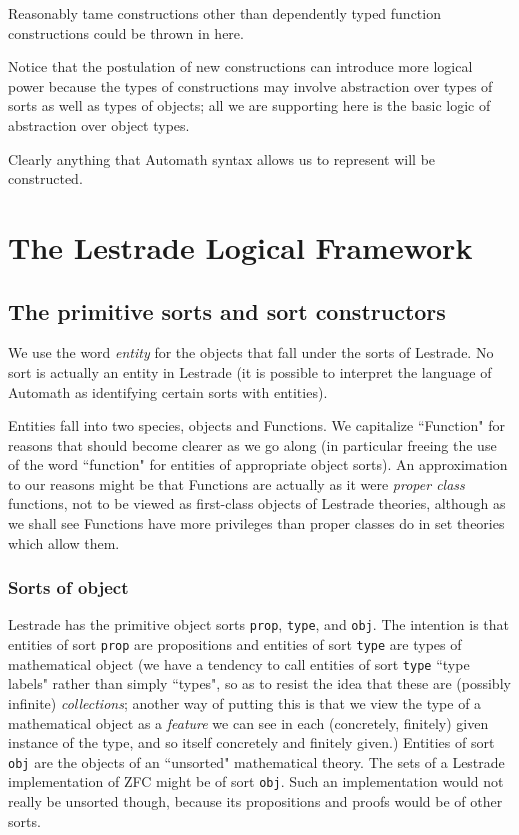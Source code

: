 \documentclass[12pt]{article}
\begin{document}
Reasonably tame constructions other than dependently typed function constructions could be thrown in here.

Notice that the postulation of new constructions can introduce more logical power because the types of constructions may involve abstraction over types of sorts as well as types of objects; all we are supporting here is the basic logic of abstraction over object types.

Clearly anything that Automath syntax allows us to represent will be constructed.

\newpage

\section{The Lestrade Logical Framework}

\subsection{The primitive sorts and sort constructors}

We use the word {\em entity\/} for the objects that fall under the sorts of Lestrade.  No sort is actually an entity in Lestrade (it is possible to interpret the language of Automath as identifying certain sorts with entities).

Entities fall into two species, objects and Functions.  We capitalize ``Function" for reasons that should become clearer as we go along (in particular freeing the use of the word ``function" for entities of appropriate object sorts).  An approximation to our reasons might be that Functions are actually as it were {\em proper class\/} functions, not to be viewed as first-class objects of Lestrade theories, although as we shall see Functions have more privileges than proper classes do in set theories which allow them.

\subsubsection{Sorts of object}

Lestrade has the primitive object sorts {\tt prop}, {\tt type}, and {\tt obj}.  The intention is that entities of sort {\tt prop} are propositions and entities of sort {\tt type} are types of mathematical object
(we have a tendency to call entities of sort {\tt type} ``type labels" rather than simply ``types", so as to resist the idea that these are (possibly infinite) {\em collections\/};  another way of putting this is that we view the type of a mathematical object as a {\em feature\/} we can see in each (concretely, finitely) given instance of the type, and so itself concretely and finitely given.)
Entities of sort {\tt obj} are the objects of an ``unsorted" mathematical theory.  The sets of a Lestrade implementation of ZFC might be of sort {\tt obj}.  Such an implementation would not really be unsorted though, because its propositions and proofs would be of other sorts.
\end{document}
